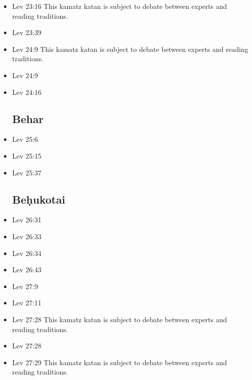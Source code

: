 \documentclass[14pt]{book}
\begin{document}
\begin{multicols}{2}
\begin{itemize}
\item Lev 23:16 This kamatz katan is subject to debate between experts and reading traditions.

\item Lev 23:39

\item Lev 24:9 This kamatz katan is subject to debate between experts and reading traditions.

\item Lev 24:9

\item Lev 24:16

\subsection{Behar}

\item Lev 25:6

\item Lev 25:15

\item Lev 25:37

\subsection{Be\d{h}ukotai}

\item Lev 26:31

\item Lev 26:33

\item Lev 26:34

\item Lev 26:43

\item Lev 27:9

\item Lev 27:11

\item Lev 27:28 This kamatz katan is subject to debate between experts and reading traditions.

\item Lev 27:28

\item Lev 27:29 This kamatz katan is subject to debate between experts and reading traditions.
\end{itemize}\end{multicols}
\end{document}
